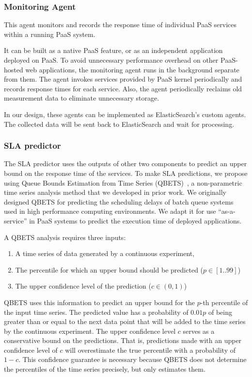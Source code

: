 \documentclass[11pt]{article}
\begin{document}
\subsubsection{Monitoring Agent}
This agent monitors and records the response time of individual PaaS services within a running PaaS system.

It can be built as a native PaaS feature, or as an independent application deployed on PaaS. To avoid unnecessary
performance overhead on other PaaS-hosted web applications, the monitoring agent runs in the background separate from them.
The agent invokes services provided by PaaS kernel periodically and records response times for each service. Also, the agent periodically
reclaims old measurement data to eliminate unnecessary storage.

In our design, these agents can be implemented as ElasticSearch's custom agents. The collected data will be sent back to ElasticSearch
and wait for processing.

\subsubsection{SLA predictor}
The SLA predictor uses the outputs of other two components to predict an upper bound 
on the response time of the services.
To make SLA predictions, we propose using Queue Bounds Estimation from Time Series 
(QBETS)~\cite{Nurmi:2007:QQB:1791551.1791556}, 
a non-parametric time series analysis method that we developed in prior work. 
We originally designed QBETS for
predicting the scheduling delays of batch queue systems 
used in high performance computing environments. 
We adapt it for use ``as-a-service'' in PaaS systems 
to predict the execution time of deployed applications.

A QBETS analysis requires three inputs:
\begin{enumerate}
\item A time series of data generated by a continuous experiment,
\item The percentile for which an upper bound should be predicted ($p \in [1..99]$)
\item The upper confidence level of the prediction ($c \in (0,1)$)
\end{enumerate}

QBETS uses this information to predict an upper bound for 
the $p$-th percentile of the input time series.
The predicted value has a probability of $0.01p$ of 
being greater than or equal to the next data point that
will be added to the time series by the continuous experiment. 
The upper confidence level $c$ serves as a conservative
bound on the predictions. That is, predictions made with an upper confidence 
level of $c$ will overestimate
the true percentile with a probability of $1-c$. This confidence guarantee 
is necessary because 
QBETS does not determine the 
percentiles of the time series precisely, but only estimates them.
\end{document}
